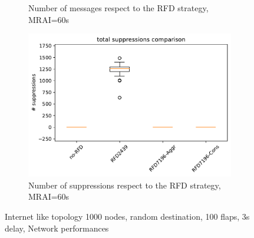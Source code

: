 \begin{figure}[H]
\begin{subfigure}[b]{0.325\textwidth}
         \caption{Number of messages respect to the RFD strategy, MRAI=60s}
         \label{fig:1000_RFD_MRAI30_messages_elephant}
     \end{subfigure}
     \hfill
     \begin{subfigure}[b]{0.325\textwidth}
         \centering
         \includegraphics[width=\textwidth]{images/RFD/miceVSelephants/MultiMRAI/60/elephants/cisco_1000MRAI60_rfd_comparison_suppressions_boxplot.pdf}
         \caption{Number of suppressions respect to the RFD strategy, MRAI=60s}
         \label{fig:1000_RFD_MRAI30_suppressions_elephant}
     \end{subfigure}
        \caption{Internet like topology 1000 nodes, random destination, 100 flaps, 3s delay, Network performances}
        \label{fig:1000_RFD_MRAI30_elephant}
\end{figure}

